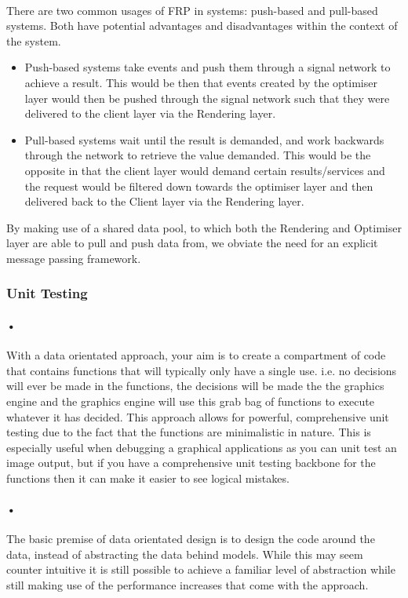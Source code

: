 \documentclass[11pt]{article}
\begin{document}
\paragraph{}
There are two common usages of FRP in systems: push-based and pull-based systems. Both have potential advantages and disadvantages within the context of the system.

\begin{itemize}
\item Push-based systems take events and push them through a signal network to achieve a result. This would be then that events created by the optimiser layer would then be pushed through the signal network such that they were delivered to the client layer via the Rendering layer.

\item Pull-based systems wait until the result is demanded, and work backwards through the network to retrieve the value demanded. This would be the opposite in that the client layer would demand certain results/services and the request would be filtered down towards the optimiser layer and then delivered back to the Client layer via the Rendering layer.
\end{itemize}

By making use of a shared data pool, to which both the Rendering and Optimiser layer are able to pull and push data from, we obviate the need for an explicit message passing framework.
\subsubsection{Unit Testing}
\paragraph{•}
With a data orientated approach, your aim is to create a compartment of code that contains functions that will typically only have a single use. i.e. no decisions will ever be made in the functions, the decisions will be made the the graphics engine and the graphics engine will use this grab bag of functions to execute whatever it has decided. This approach allows for powerful, comprehensive unit testing due to the fact that the functions are minimalistic in nature. This is especially useful when debugging a graphical applications as you can unit test an image output, but if you have a comprehensive unit testing backbone for the functions then it can make it easier to see logical mistakes.
\paragraph{•}
The basic premise of data orientated design is to design the code around the data, instead of abstracting the data behind models. While this may seem counter intuitive it is still possible to achieve a familiar level of abstraction while still making use of the performance increases that come with the approach.
\end{document}
